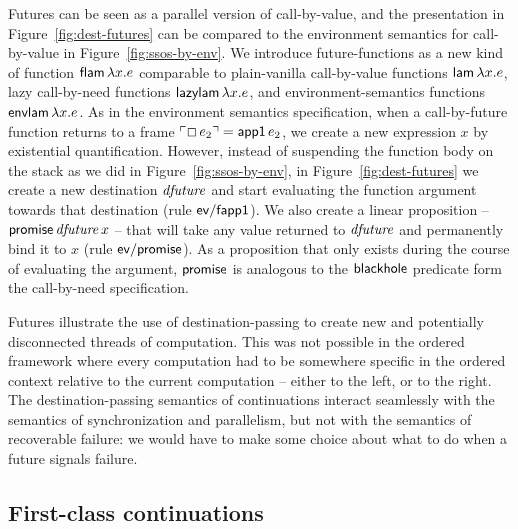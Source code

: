 Futures can be seen as a parallel version of call-by-value, and the
presentation in Figure~\ref{fig:dest-futures} can be compared to the
environment semantics for call-by-value in
Figure~\ref{fig:ssos-by-env}. We introduce future-functions as a new
kind of function ${\sf flam}\,\lambda x.e$ comparable to plain-vanilla
call-by-value functions ${\sf lam}\,\lambda x.e$, lazy call-by-need
functions ${\sf lazylam}\,\lambda x.e$, and environment-semantics
functions ${\sf envlam}\,\lambda x.e$. As in the environment semantics
specification, when a call-by-future function returns to a frame
${\ulcorner{\Box\,e_2}\urcorner} = {\sf app1}\,e_2$, we create a new expression $x$
by existential quantification. However, instead of suspending the
function body on the stack as we did in Figure~\ref{fig:ssos-by-env},
in Figure~\ref{fig:dest-futures} we create a new destination ${\it
  dfuture}$ and start evaluating the function argument towards that
destination (rule ${\sf ev/fapp1}$). We also create a linear
proposition -- ${\sf promise}\,{\it dfuture}\,x$ -- that will take
any value returned to ${\it dfuture}$ and permanently bind it to $x$
(rule ${\sf ev/promise}$). As a proposition that only exists during
the course of evaluating the argument, ${\sf promise}$ is analogous to
the ${\sf blackhole}$ predicate form the call-by-need specification.

Futures illustrate the use of destination-passing to create new and
potentially disconnected threads of computation. This was not possible
in the ordered framework where every computation had to be somewhere
specific in the ordered context relative to the current computation --
either to the left, or to the right. The destination-passing semantics
of continuations interact seamlessly with the semantics of
synchronization and parallelism, but not with the semantics of
recoverable failure: we would have to make some choice about what to 
do when a future signals failure.

\subsection{First-class continuations}
\label{sec:dest-continuations}

